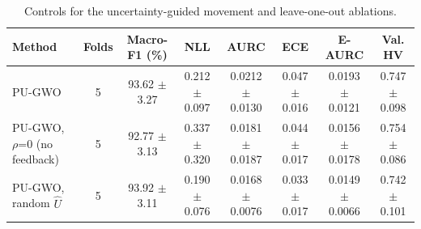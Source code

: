 \begin{table}[t]
\centering
\caption{Controls for the uncertainty-guided movement and leave-one-out ablations.}
\label{tab:table7_controls}
\small
\begin{tabular}{lccccccc}
\toprule
Method & Folds & Macro-F1 (\%) & NLL & AURC & ECE & E-AURC & Val. HV \\
\midrule
PU-GWO & 5 & 93.62 $\pm$ 3.27 & 0.212 $\pm$ 0.097 & 0.0212 $\pm$ 0.0130 & 0.047 $\pm$ 0.016 & 0.0193 $\pm$ 0.0121 & 0.747 $\pm$ 0.098 \\
PU-GWO, $\rho$=0 (no feedback) & 5 & 92.77 $\pm$ 3.13 & 0.337 $\pm$ 0.320 & 0.0181 $\pm$ 0.0187 & 0.044 $\pm$ 0.017 & 0.0156 $\pm$ 0.0178 & 0.754 $\pm$ 0.086 \\
PU-GWO, random $\hat{U}$ & 5 & 93.92 $\pm$ 3.11 & 0.190 $\pm$ 0.076 & 0.0168 $\pm$ 0.0076 & 0.033 $\pm$ 0.017 & 0.0149 $\pm$ 0.0066 & 0.742 $\pm$ 0.101 \\
\bottomrule
\end{tabular}
\end{table}
